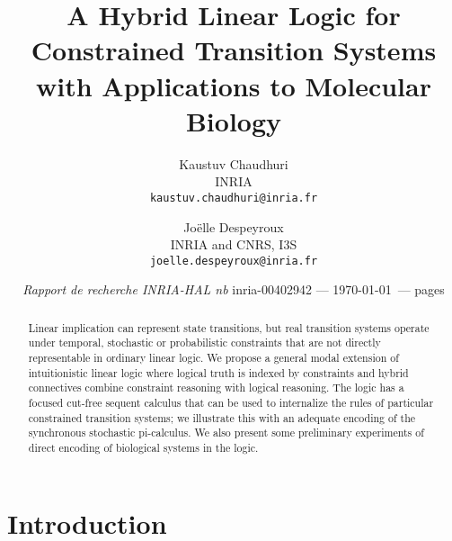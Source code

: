 \documentclass{article}
\title{A Hybrid Linear Logic for Constrained Transition Systems
       \\ with Applications to Molecular Biology}
\author{
  Kaustuv Chaudhuri\\INRIA\\\texttt{kaustuv.chaudhuri@inria.fr}
  \and
  Jo\"{e}lle Despeyroux\\INRIA and CNRS, I3S\\\texttt{joelle.despeyroux@inria.fr}
}
\date{{\em Rapport de recherche INRIA-HAL nb} inria-00402942 --- \today\ --- \pageref{LastPage} pages}
\begin{document}
\maketitle

\begin{abstract}
  Linear implication can represent state transitions, but real transition
  systems operate under temporal, stochastic or probabilistic constraints that
  are not directly representable in ordinary linear logic. We propose a general
  modal extension of intuitionistic linear logic where logical truth is indexed
  by constraints and hybrid connectives combine constraint reasoning with
  logical reasoning. The logic has a focused cut-free sequent calculus that can
  be used to internalize the rules of particular constrained transition systems;
  we illustrate this with an adequate encoding of the synchronous stochastic
  pi-calculus.
  We also present some preliminary experiments of direct encoding of biological 
  systems in the logic.
\end{abstract}

\section{Introduction}
\label{sec:intro}
\end{document}
